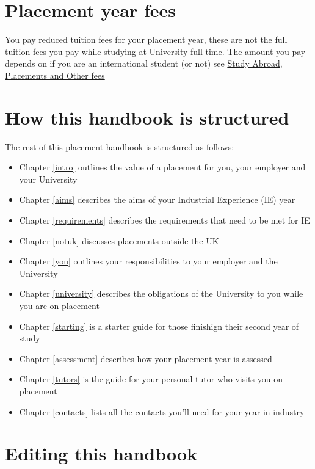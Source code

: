 \documentclass[
]{book}
\providecommand{\tightlist}{%
  \setlength{\itemsep}{0pt}\setlength{\parskip}{0pt}}
\begin{document}
\section{Placement year fees}\label{fees}

You pay reduced tuition fees for your placement year, these are not the full tuition fees you pay while studying at University full time. The amount you pay depends on if you are an international student (or not) see \href{https://www.studentsupport.manchester.ac.uk/finances/tuition-fees/fee-amounts/other-fees/}{Study Abroad, Placements and Other fees} \citep{fees}

\section{How this handbook is structured}\label{guide}

The rest of this placement handbook is structured as follows:

\begin{itemize}
\tightlist
\item
  Chapter \ref{intro} outlines the value of a placement for you, your employer and your University
\item
  Chapter \ref{aims} describes the aims of your Industrial Experience (IE) year
\item
  Chapter \ref{requirements} describes the requirements that need to be met for IE
\item
  Chapter \ref{notuk} discusses placements outside the UK
\item
  Chapter \ref{you} outlines your responsibilities to your employer and the University
\item
  Chapter \ref{university} describes the obligations of the University to you while you are on placement
\item
  Chapter \ref{starting} is a starter guide for those finishign their second year of study
\item
  Chapter \ref{assessment} describes how your placement year is assessed
\item
  Chapter \ref{tutors} is the guide for your personal tutor who visits you on placement
\item
  Chapter \ref{contacts} lists all the contacts you'll need for your year in industry
\end{itemize}

\section{Editing this handbook}\label{edit}
\end{document}
